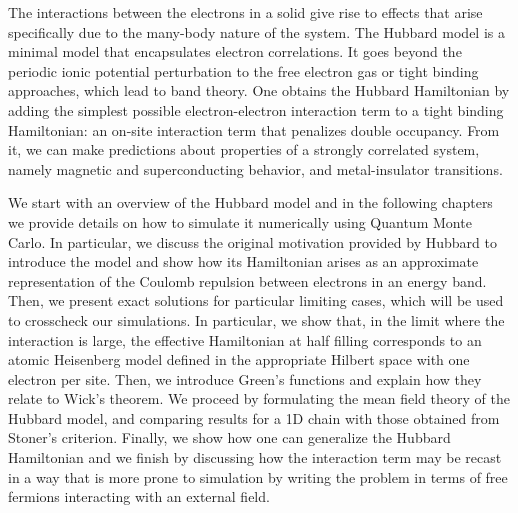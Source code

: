 
\label{cap:hubbard}

\slshape

The interactions between the electrons in a solid give rise to effects that arise specifically due to the many-body nature of the system.
The Hubbard model is a minimal model that encapsulates electron correlations.
It goes beyond the periodic ionic potential perturbation to the free electron gas or tight binding approaches, which lead to band theory.
One obtains the Hubbard Hamiltonian by adding the simplest possible electron-electron interaction term to a tight binding Hamiltonian: an on-site interaction term that penalizes double occupancy.
From it, we can make predictions about properties of a strongly correlated system, namely magnetic and superconducting behavior, and metal-insulator transitions.

We start with an overview of the Hubbard model and in the following chapters we provide details on how to simulate it numerically using Quantum Monte Carlo. In particular, we discuss the original motivation provided by Hubbard to introduce the model and show how its Hamiltonian arises as an approximate representation of the Coulomb repulsion between electrons in an energy band. Then, we present exact solutions for particular limiting cases, which will be used to crosscheck our simulations. In particular, we show that, in the limit where the interaction is large, the effective Hamiltonian at half filling corresponds to an atomic Heisenberg model defined in the appropriate Hilbert space with one electron per site.
Then, we introduce Green's functions and explain how they relate to Wick's theorem. We proceed by formulating the mean field theory of the Hubbard model, and comparing results for a \acs{1D} chain with those obtained from Stoner's criterion.
Finally, we show how one can generalize the Hubbard Hamiltonian and we finish by discussing how the interaction term may be recast in a way that is more prone to simulation by writing the problem in terms of free fermions interacting with an external field.

\normalfont









\cleardoublepage
